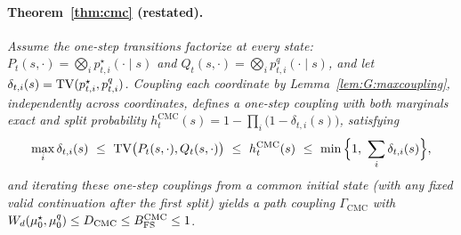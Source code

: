 \paragraph{Theorem~\ref{thm:cmc} (restated).}
\emph{Assume the one-step transitions factorize at every state:
$P_{t}(s,\cdot)=\bigotimes_{i}p^{\star}_{t,i}(\cdot\mid s)$ and
$Q_{t}(s,\cdot)=\bigotimes_{i}p^{q}_{t,i}(\cdot\mid s)$, and let
$\delta_{t,i}(s)=\mathrm{TV}(p^{\star}_{t,i},p^{q}_{t,i})$. Coupling each coordinate by
Lemma~\ref{lem:G:maxcoupling}, independently across coordinates, defines a one-step coupling with
both marginals exact and split probability
$h^{\mathrm{CMC}}_{t}(s)=1-\prod_{i}\big(1-\delta_{t,i}(s)\big)$, satisfying}
\[
\max_{i}\delta_{t,i}(s)\ \le\ \TV\big(P_{t}(s,\cdot),Q_{t}(s,\cdot)\big)\ \le\
h^{\mathrm{CMC}}_{t}(s)\ \le\ \min\Big\{1,\ \sum_{i}\delta_{t,i}(s)\Big\},
\]
\emph{and iterating these one-step couplings from a common initial state (with any fixed valid
continuation after the first split) yields a path coupling $\Gamma_{\mathrm{CMC}}$ with}
$W_{d}(\mu^{\star}_{0},\mu^{q}_{0})\le D_{\mathrm{CMC}}\le B_{\mathrm{FS}}^{\mathrm{CMC}}\le1$.

